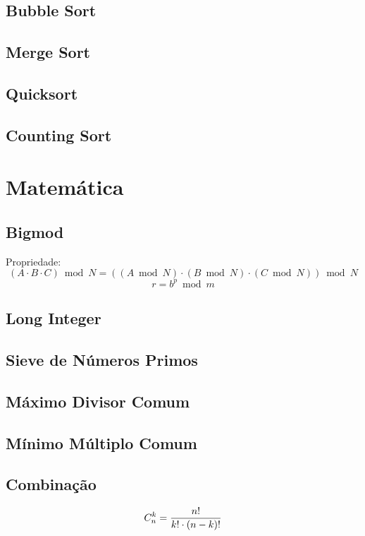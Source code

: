 \documentclass[12pt,a4paper]{article}
\begin{document}
		\subsection{Bubble Sort}
			
		\subsection{Merge Sort}
			
		\subsection{Quicksort}
			
		\subsection{Counting Sort}
			
	
	\section{Matemática}
		\subsection{Bigmod}
			Propriedade:
			\[ (A \cdot B \cdot C) \bmod N = ((A \bmod N) \cdot (B \bmod N) \cdot (C \bmod N)) \bmod N \]
			\[ r = b^p \bmod m \]
			
		\subsection{Long Integer}
			
		\subsection{Sieve de Números Primos}
			
		\subsection{Máximo Divisor Comum}
			
		\subsection{Mínimo Múltiplo Comum}
			
		\subsection{Combinação}
			\[ C_n^k = {n! \over {k! \cdot (n - k)!}} \]
			
\end{document}
